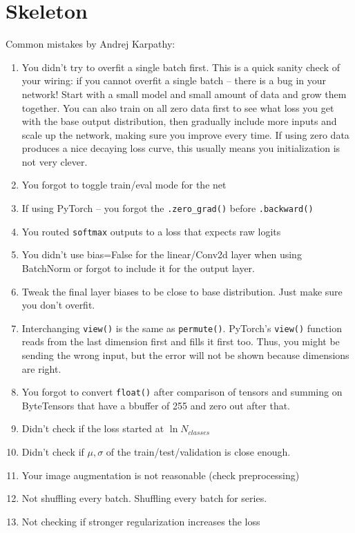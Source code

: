 \section*{Skeleton}

Common mistakes by Andrej Karpathy:

\begin{enumerate}
\item You didn't try to overfit a single batch first. This is a quick sanity check of your wiring: if you cannot overfit a single batch -- there is a bug in your network! Start with a small model and small amount of data and grow them together. You can also train on all zero data first to see what loss you get with the base output distribution, then gradually include more inputs and scale up the network, making sure you improve every time. If using zero data produces a nice decaying loss curve, this usually means you initialization is not very clever.
\item You forgot to toggle train/eval mode for the net
\item If using PyTorch  -- you forgot the \verb+.zero_grad()+ before \verb+.backward()+
\item You routed \verb+softmax+ outputs to a loss that expects raw logits
\item You didn't use bias=False for the linear/Conv2d layer when using BatchNorm or forgot to include it for the output layer.
\item Tweak the final layer biases to be close to base distribution. Just make sure you don't overfit.
\item Interchanging \verb+view()+ is the same as \verb+permute()+. PyTorch's \verb+view()+ function reads from the last dimension first and fills it first too. Thus, you might be sending the wrong input, but the error will not be shown because dimensions are right.
\item You forgot to convert \verb+float()+ after comparison of tensors and summing on ByteTensors that have a bbuffer of 255 and zero out after that.
\item Didn't check if the loss started at $\ln{N_{classes}}$
\item Didn't check if $\mu, \sigma$ of the train/test/validation is close enough.
\item Your image augmentation is not reasonable (check preprocessing)
\item Not shuffling every batch. Shuffling every batch for series.
\item Not checking if stronger regularization increases the loss
\end{enumerate}